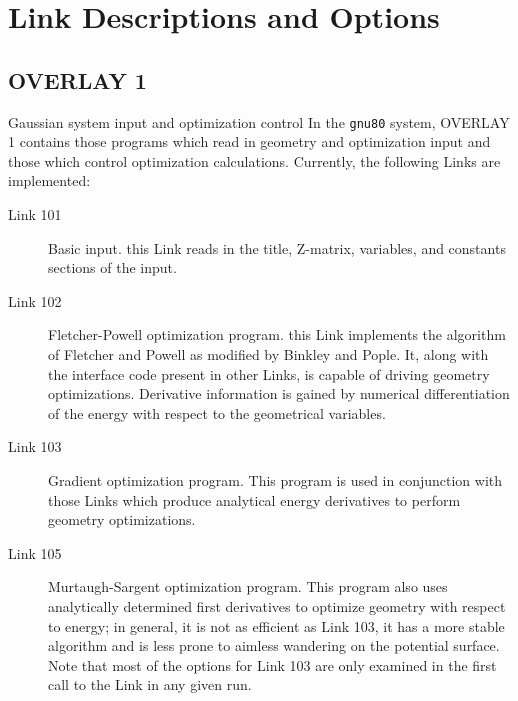 \chapter{\sf Link Descriptions and Options}
\label{app3b}
\section{\sf OVERLAY 1} 
Gaussian system input and optimization control
In the {\tt gnu80} system, OVERLAY 1 contains those programs which
read in geometry and optimization input and those which control
optimization calculations. Currently, the following Links are
implemented:
\begin{description}
\item[Link 101] Basic input. this Link reads in the title, Z-matrix,
variables, and constants sections of the input.
\item[Link 102] Fletcher-Powell optimization program. this Link implements
the algorithm of Fletcher and Powell as modified by
Binkley and Pople.  It, along with the interface code
present in other Links, is capable of driving geometry
optimizations.  Derivative information is gained by
numerical differentiation of the energy with respect to
the geometrical variables.
\item[Link 103] Gradient optimization program. This program is used in
conjunction with those Links which produce analytical
energy derivatives to perform geometry optimizations.
\item[Link 105] Murtaugh-Sargent optimization program.  This program also
uses analytically determined first derivatives to optimize
geometry with respect to energy; in general, it
is not as efficient as Link 103, it has a more stable
algorithm and is less prone to aimless wandering on the
potential surface.
Note that most of the options for Link 103 are only examined in the
first call to the Link in any given run.
\end{description}
